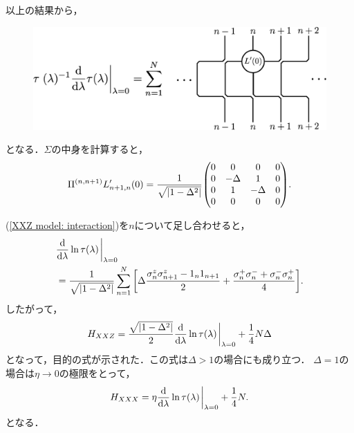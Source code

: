 \documentclass[\main/main.tex]{subfiles}
\begin{document}
\begin{frame}{}
    以上の結果から，
    \begin{figure}[H]
        \centering
        \includegraphics[scale = 0.35]{Baxter_formula.pdf}
    \end{figure}
    となる．$\Sigma$の中身を計算すると，
    \begin{align}
        \Pi^{(n,n+1)}  L_{n+1,n}'(0)
        = \frac{1}{\sqrt{|1-\Delta^2|}}\mqty(
            0&0&0&0\\
            0&-\Delta&1&0\\
            0&1&-\Delta&0\\
            0&0&0&0
        ).
        \label{XXZ model: interaction}
    \end{align}
\end{frame}

\begin{frame}{}
    (\ref{XXZ model: interaction})を$n$について足し合わせると，
    \begin{align}
        &\nonumber
        \dv{\lambda}\ln\tau(\lambda)\eval_{\lambda=0}
        \\ &
        = \frac{1}{\sqrt{|1-\Delta^2|}} \sum_{n=1}^N \qty[
            \Delta \frac{\sigma_n^z \sigma_{n+1}^z - 1_n 1_{n+1}}{2} + \frac{\sigma_n^+\sigma_n^- + \sigma_n^- \sigma_n^+}{4}
        ].
    \end{align}
    したがって，
    \begin{align}
        H_{XXZ} 
        = \frac{\sqrt{|1-\Delta^2|}}{2}\dv{\lambda}\ln\tau(\lambda)\eval_{\lambda=0} + \frac{1}{4}N\Delta
    \end{align}
    となって，目的の式が示された．この式は$\Delta>1$の場合にも成り立つ．
    $\Delta = 1$の場合は$\eta \to 0$の極限をとって，
    \begin{align}
        H_{XXX} = \eta \dv{\lambda}\ln\tau(\lambda)\eval_{\lambda=0} + \frac{1}{4}N.
    \end{align}
    となる．
\end{frame}
\end{document}
